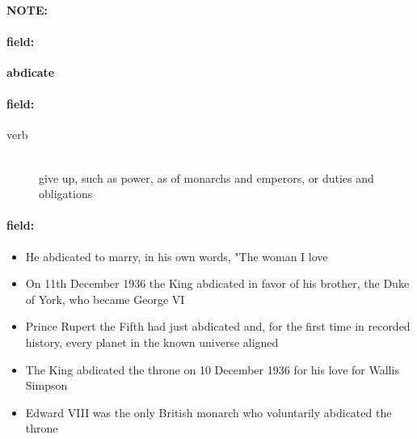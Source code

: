 \documentclass[12pt]{article}
\newenvironment{note}{\paragraph{NOTE:}}{}
\newenvironment{field}{\paragraph{field:}}{}
\begin{document}
\begin{note}
\begin{field}
\textbf{\large abdicate}
\end{field}


\begin{field}
\begin{description}
\item[verb] \hfill \\ 
give up, such as power, as of monarchs and emperors, or duties and obligations

\end{description}
\end{field}

\begin{field}
\begin{itemize}
\item He abdicated to marry, in his own words, "The woman I love
\item On 11th December 1936 the King abdicated in favor of his brother, the Duke of York, who became George VI
\item Prince Rupert the Fifth had just abdicated and, for the first time in recorded history, every planet in the known universe aligned
\item The King abdicated the throne on 10 December 1936 for his love for Wallis Simpson
\item Edward VIII was the only British monarch who voluntarily abdicated the throne
\end{itemize}
\end{field}
\end{note}
\end{document}
